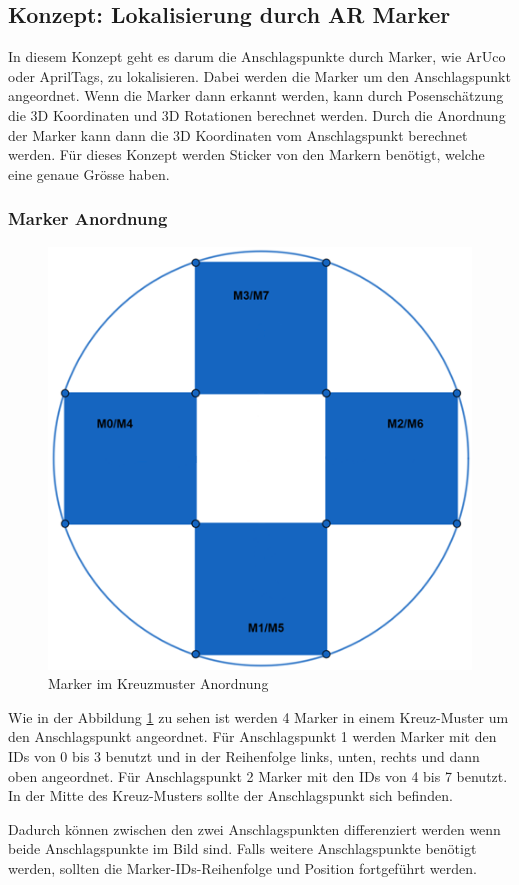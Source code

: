 \subsection{Konzept: Lokalisierung durch AR Marker}

In diesem Konzept geht es darum die Anschlagspunkte durch Marker, wie ArUco oder AprilTags, zu lokalisieren. Dabei werden die Marker um den Anschlagspunkt angeordnet. Wenn die Marker dann erkannt werden, kann durch Posenschätzung die 3D Koordinaten und 3D Rotationen berechnet werden. Durch die Anordnung der Marker kann dann die 3D Koordinaten vom Anschlagspunkt berechnet werden. 
Für dieses Konzept werden Sticker von den Markern benötigt, welche eine genaue Grösse haben. 

\subsubsection{Marker Anordnung}
\label{sec:anordnung}

\begin{figure}[H]
    \centering
    \includegraphics[width=0.5\linewidth]{graphics/anordnung_marker.png}
    \caption{Marker im Kreuzmuster Anordnung}
    \label{fig:markerAnordnung}
\end{figure}

Wie in der Abbildung \ref{fig:markerAnordnung} zu sehen ist werden 4 Marker in einem Kreuz-Muster um den Anschlagspunkt angeordnet. 
Für Anschlagspunkt 1 werden Marker mit den IDs von 0 bis 3 benutzt und in der Reihenfolge links, unten, rechts und dann oben angeordnet. 
Für Anschlagspunkt 2 Marker mit den IDs von 4 bis 7 benutzt. 
In der Mitte des Kreuz-Musters sollte der Anschlagspunkt sich befinden. 

Dadurch können zwischen den zwei Anschlagspunkten differenziert werden wenn beide Anschlagspunkte im Bild sind. 
Falls weitere Anschlagspunkte benötigt werden, sollten die Marker-IDs-Reihenfolge und Position fortgeführt werden. 


